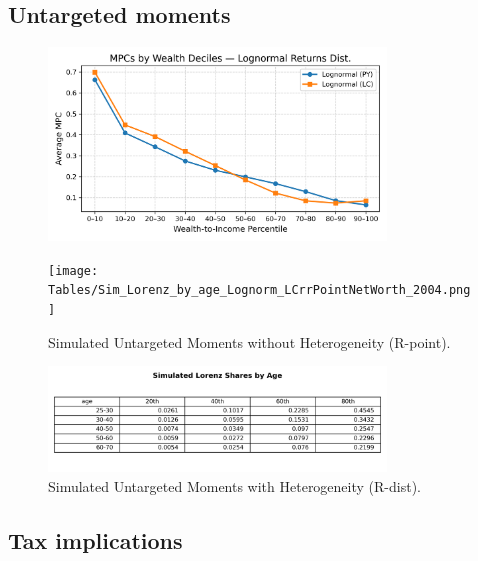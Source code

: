\par




\subsection{Untargeted moments}

\par 


\par

\begin{figure}[htbp]
\centering
\includegraphics[width=0.8\textwidth]{Tables/Lognorm_PY_LC_MPC_by_WealthDecile_compare.png}
\label{fig:LognormPYLCMPCCompare}
\end{figure}


\par

\begin{figure}[htbp]
\centering
\texttt{[image: Tables/Sim\_Lorenz\_by\_age\_Lognorm\_LCrrPointNetWorth\_2004.png]}
\caption{Simulated Untargeted Moments without Heterogeneity (R-point).}
\label{fig:SimLorenzTarPoint}
\end{figure}

\begin{figure}[htbp]
\centering
\includegraphics[width=0.8\textwidth]{Tables/Sim_Lorenz_by_age_Lognorm_LCrrDistNetWorth_2004.png}
\caption{Simulated Untargeted Moments with Heterogeneity (R-dist).}
\label{fig:SimLorenzTarDist}
\end{figure}

\subsection{Tax implications}

\par 



\par






\par